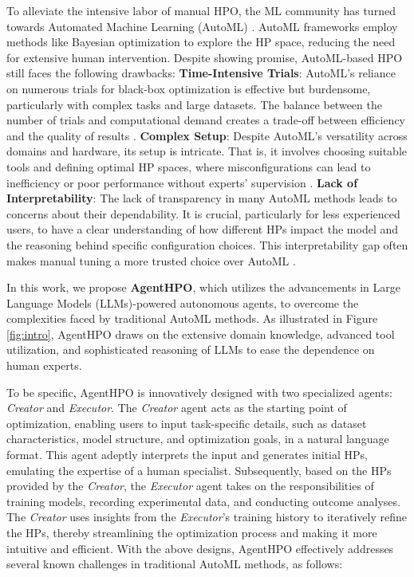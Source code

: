 \documentclass{article}
\begin{document}
To alleviate the intensive labor of manual HPO, the ML community has turned towards Automated Machine Learning (AutoML) \cite{hutter2019automated}. AutoML frameworks employ methods like Bayesian optimization \cite{shahriari2015taking} to explore the HP space, reducing the need for extensive human intervention. Despite showing promise, AutoML-based HPO still faces the following drawbacks:
\textbf{Time-Intensive Trials}: AutoML's reliance on numerous trials for black-box optimization is effective but burdensome, particularly with complex tasks and large datasets. The balance between the number of trials and computational demand creates a trade-off between efficiency and the quality of results \cite{yu2020hyper, yang2020hyperparameter, tornede2023automl}. 
\textbf{Complex Setup}: Despite AutoML's versatility across domains and hardware, its setup is intricate. That is, it involves choosing suitable tools and defining optimal HP spaces, where misconfigurations can lead to inefficiency or poor performance without experts' supervision \cite{wistuba2015hyperparameter}. 
\textbf{Lack of Interpretability}: The lack of transparency in many AutoML methods leads to concerns about their dependability. It is crucial, particularly for less experienced users, to have a clear understanding of how different HPs impact the model and the reasoning behind specific configuration choices. This interpretability gap often makes manual tuning a more trusted choice over AutoML \cite{gilpin2018explaining, moosbauer2022enhancing, hasebrook2022machine}.

In this work, we propose \textbf{AgentHPO}, which utilizes the advancements in Large Language Models (LLMs)-powered autonomous agents, to overcome the complexities faced by traditional AutoML methods. As illustrated in Figure \ref{fig:intro}, AgentHPO draws on the extensive domain knowledge, advanced tool utilization, and sophisticated reasoning of LLMs to ease the dependence on human experts.

To be specific, AgentHPO is innovatively designed with two specialized agents: \textit{Creator} and \textit{Executor}. The \textit{Creator} agent acts as the starting point of optimization, enabling users to input task-specific details, such as dataset characteristics, model structure, and optimization goals, in a natural language format. This agent adeptly interprets the input and generates initial HPs, emulating the expertise of a human specialist. Subsequently, based on the HPs provided by the \textit{Creator}, the \textit{Executor} agent takes on the responsibilities of training models, recording experimental data, and conducting outcome analyses. The \textit{Creator} uses insights from the \textit{Executor}'s training history to iteratively refine the HPs, thereby streamlining the optimization process and making it more intuitive and efficient. With the above designs, AgentHPO effectively addresses several known challenges in traditional AutoML methods, as follows:
\end{document}

